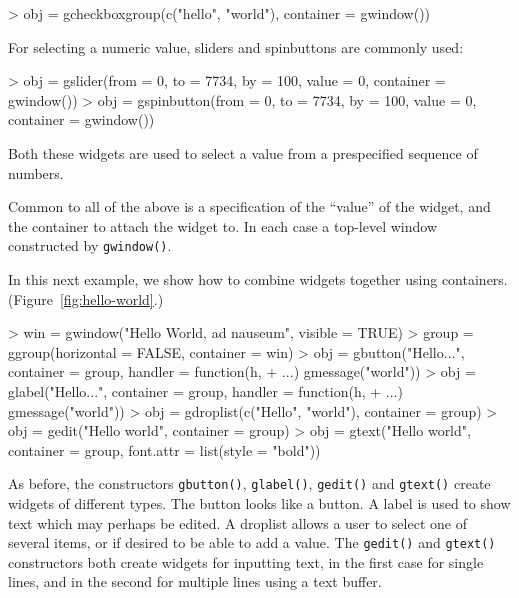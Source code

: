 \documentclass[12pt]{article}
\newcommand{\RFunc}[1]{\texttt{#1()}}
\begin{document}
\begin{Schunk}
\begin{Sinput}
> obj = gcheckboxgroup(c("hello", "world"), container = gwindow())
\end{Sinput}
\end{Schunk}



For selecting a numeric value, sliders and spinbuttons are commonly used:
\begin{Schunk}
\begin{Sinput}
> obj = gslider(from = 0, to = 7734, by = 100, value = 0, container = gwindow())
> obj = gspinbutton(from = 0, to = 7734, by = 100, value = 0, container = gwindow())
\end{Sinput}
\end{Schunk}
Both these widgets are used to select a value from a prespecified
sequence of numbers.


Common to all of the above is a specification of the ``value'' of the
widget, and the container to attach the widget to. In each case a
top-level window constructed by \RFunc{gwindow}.


In this next example, we show how to  combine widgets together using
containers. (Figure~\ref{fig:hello-world}.)


\begin{Schunk}
\begin{Sinput}
> win = gwindow("Hello World, ad nauseum", visible = TRUE)
> group = ggroup(horizontal = FALSE, container = win)
> obj = gbutton("Hello...", container = group, handler = function(h, 
+     ...) gmessage("world"))
> obj = glabel("Hello...", container = group, handler = function(h, 
+     ...) gmessage("world"))
> obj = gdroplist(c("Hello", "world"), container = group)
> obj = gedit("Hello world", container = group)
> obj = gtext("Hello world", container = group, font.attr = list(style = "bold"))
\end{Sinput}
\end{Schunk}


As before, the constructors \RFunc{gbutton}, \RFunc{glabel},
\RFunc{gedit} and \RFunc{gtext} create widgets of different types.
The button looks like a button. A label is used to show text which may
perhaps be edited. A droplist allows a user to select one of several
items, or if desired to be able to add a value. The \RFunc{gedit} and
\RFunc{gtext} constructors both create widgets for inputting text, in
the first case for single lines, and in the second for multiple lines
using a text buffer.
\end{document}
